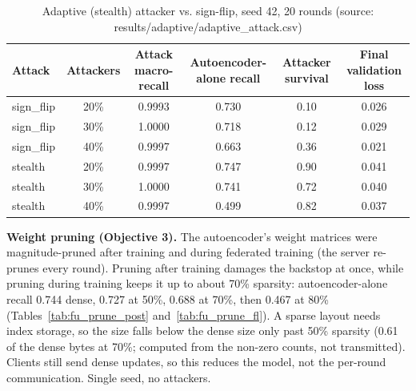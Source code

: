 \begin{table}[H]
\centering
\scriptsize
\setlength{\tabcolsep}{3pt}
\renewcommand{\arraystretch}{1.15}
\begin{tabular}{|l|c|c|c|c|c|}
\hline
\textbf{Attack} & \textbf{Attackers} & \textbf{Attack macro-recall} & \textbf{Autoencoder-alone recall} & \textbf{Attacker survival} & \textbf{Final validation loss} \\ \hline
sign\_flip & 20\% & 0.9993 & 0.730 & 0.10 & 0.026 \\ \hline
sign\_flip & 30\% & 1.0000 & 0.718 & 0.12 & 0.029 \\ \hline
sign\_flip & 40\% & 0.9997 & 0.663 & 0.36 & 0.021 \\ \hline
stealth & 20\% & 0.9997 & 0.747 & 0.90 & 0.041 \\ \hline
stealth & 30\% & 1.0000 & 0.741 & 0.72 & 0.040 \\ \hline
stealth & 40\% & 0.9997 & 0.499 & 0.82 & 0.037 \\ \hline
\end{tabular}
\caption{Adaptive (stealth) attacker vs. sign-flip, seed 42, 20 rounds (source: results/adaptive/adaptive\_attack.csv)}
\label{tab:fu_adaptive}
\end{table}
\textbf{Weight pruning (Objective 3).} The autoencoder's weight matrices were magnitude-pruned after training and during federated training (the server re-prunes every round). Pruning after training damages the backstop at once, while pruning during training keeps it up to about 70\% sparsity: autoencoder-alone recall 0.744 dense, 0.727 at 50\%, 0.688 at 70\%, then 0.467 at 80\% (Tables~\ref{tab:fu_prune_post} and~\ref{tab:fu_prune_fl}). A sparse layout needs index storage, so the size falls below the dense size only past 50\% sparsity (0.61 of the dense bytes at 70\%; computed from the non-zero counts, not transmitted). Clients still send dense updates, so this reduces the model, not the per-round communication. Single seed, no attackers.

